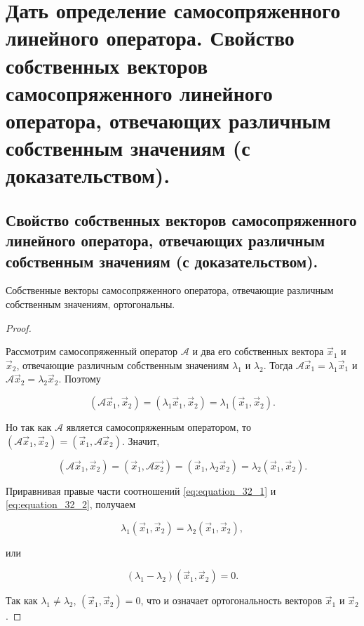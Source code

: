 \section{
    Дать определение самосопряженного линейного  оператора. Свойство собственных векторов самосопряженного линейного оператора, отвечающих различным собственным значениям (с доказательством).
}

\subsection{
    Свойство собственных векторов самосопряженного линейного оператора, отвечающих различным собственным значениям (с доказательством).
}

\begin{theorem}
    Собственные векторы самосопряженного оператора, отвечающие различным собственным значениям, ортогональны.
\end{theorem}

\begin{proof}~

    Рассмотрим самосопряженный оператор $\mathscr{A}$ и два его собственных вектора $\vec{x}_1$ и $\vec{x}_2$, отвечающие различным собственным значениям $\lambda_1$ и $\lambda_2$. Тогда $\mathscr{A}\vec{x}_1 = \lambda_1\vec{x}_1$ и $\mathscr{A}\vec{x}_2 = \lambda_2\vec{x}_2$. Поэтому

    \begin{equation}
        (\mathscr{A}\vec{x}_1, \vec{x}_2) = (\lambda_1\vec{x}_1, \vec{x}_2) = \lambda_1(\vec{x}_1, \vec{x}_2).
        \label{eq:equation_32_1}
    \end{equation}

    Но так как $\mathscr{A}$ является самосопряженным оператором, то $(\mathscr{A}\vec{x}_1, \vec{x}_2) = (\vec{x}_1, \mathscr{A}\vec{x}_2)$. Значит,

    \begin{equation}
        (\mathscr{A}\vec{x}_1, \vec{x}_2) = (\vec{x}_1, \mathscr{A}\vec{x_2}) = (\vec{x}_1, \lambda_2\vec{x}_2) = \lambda_2(\vec{x}_1, \vec{x}_2).
        \label{eq:equation_32_2}
    \end{equation}

    Приравнивая правые части соотношений \eqref{eq:equation_32_1} и \eqref{eq:equation_32_2}, получаем

    $$\lambda_1(\vec{x}_1, \vec{x}_2) = \lambda_2(\vec{x}_1, \vec{x}_2),$$

    или

    $$(\lambda_1 - \lambda_2)(\vec{x}_1, \vec{x}_2) = 0.$$

    Так как $\lambda_1 \ne \lambda_2$, $(\vec{x}_1, \vec{x}_2) = 0$, что и означает ортогональность векторов $\vec{x}_1$ и $\vec{x}_2$.
\end{proof}
